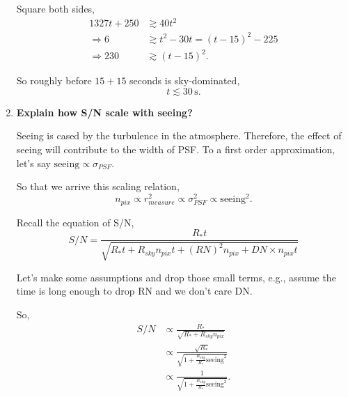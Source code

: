 \documentclass[12pt,letterpaper]{article}
\begin{document}
\begin{enumerate}
    Square both sides,
    \begin{equation*}
        \begin{split}
        1327t + 250         &\gtrsim 40 t^2 \\
            \Rightarrow 6   &\gtrsim t^2 - 30t = (t - 15)^2 - 225\\
            \Rightarrow 230 &\gtrsim (t - 15)^2.
        \end{split}
    \end{equation*}

    So roughly before $15 + 15$ seconds is sky-dominated,
    \begin{equation}
        t \lesssim 30 \, \mathrm{s}.
    \end{equation}


    \item {\bf Explain how S/N scale with seeing?}
    
    Seeing is cased by the turbulence in the atmosphere.
    Therefore, the effect of seeing will contribute to the width of PSF.
    To a first order approximation, let's say $\mathrm{seeing} \propto \sigma_{PSF}$.

    So that we arrive this scaling relation,
    \begin{equation}
        n_{pix} \propto r_{measure}^2 
            \propto \sigma_{PSF}^2 
            \propto \mathrm{seeing}^2.
    \end{equation}

    Recall the equation of S/N,
    \begin{equation}
        S/N = \frac{ R_* t }{ \sqrt{ R_* t + R_{sky} n_{pix} t + (RN)^2 n_{pix} + DN\times n_{pix} t } }
    \end{equation}

    Let's make some assumptions and drop those small terms, e.g., 
    assume the time is long enough to drop RN and we don't care DN.

    So,
    \begin{equation}
        \begin{split}
            S/N &\propto \frac{ R_* }{ \sqrt{ R_* + R_{sky} n_{pix} } }\\
                &\propto \frac{ \sqrt{R_*} }{ \sqrt{ 1 + \frac{R_{sky}}{R_*} \mathrm{seeing}^2 } }\\
                &\propto \frac{1}{\sqrt{ 1 + \frac{R_{sky}}{R_*} \mathrm{seeing}^2 }}.
        \end{split}
    \end{equation}


\end{enumerate}
\end{document}
